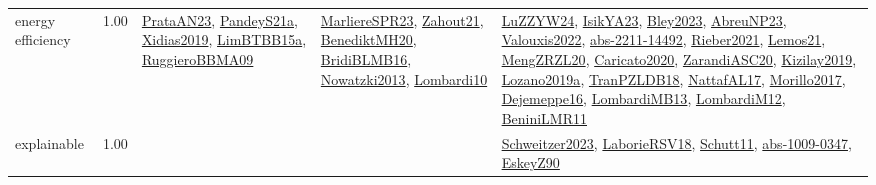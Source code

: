 {\begin{longtable}{p{3cm}r>{\raggedright\arraybackslash}p{6cm}>{\raggedright\arraybackslash}p{6cm}>{\raggedright\arraybackslash}p{8cm}}
\index{energy efficiency}\index{Concepts!energy efficiency}energy efficiency &  1.00 & \hyperref[detail:PrataAN23]{PrataAN23}, \hyperref[detail:PandeyS21a]{PandeyS21a}, \hyperref[detail:Xidias2019]{Xidias2019}, \hyperref[detail:LimBTBB15a]{LimBTBB15a}, \hyperref[detail:RuggieroBBMA09]{RuggieroBBMA09} & \hyperref[detail:MarliereSPR23]{MarliereSPR23}, \hyperref[detail:Zahout21]{Zahout21}, \hyperref[detail:BenediktMH20]{BenediktMH20}, \hyperref[detail:BridiBLMB16]{BridiBLMB16}, \hyperref[detail:Nowatzki2013]{Nowatzki2013}, \hyperref[detail:Lombardi10]{Lombardi10} & \hyperref[detail:LuZZYW24]{LuZZYW24}, \hyperref[detail:IsikYA23]{IsikYA23}, \hyperref[detail:Bley2023]{Bley2023}, \hyperref[detail:AbreuNP23]{AbreuNP23}, \hyperref[detail:Valouxis2022]{Valouxis2022}, \hyperref[detail:abs-2211-14492]{abs-2211-14492}, \hyperref[detail:Rieber2021]{Rieber2021}, \hyperref[detail:Lemos21]{Lemos21}, \hyperref[detail:MengZRZL20]{MengZRZL20}, \hyperref[detail:Caricato2020]{Caricato2020}, \hyperref[detail:ZarandiASC20]{ZarandiASC20}, \hyperref[detail:Kizilay2019]{Kizilay2019}, \hyperref[detail:Lozano2019a]{Lozano2019a}, \hyperref[detail:TranPZLDB18]{TranPZLDB18}, \hyperref[detail:NattafAL17]{NattafAL17}, \hyperref[detail:Morillo2017]{Morillo2017}, \hyperref[detail:Dejemeppe16]{Dejemeppe16}, \hyperref[detail:LombardiMB13]{LombardiMB13}, \hyperref[detail:LombardiM12]{LombardiM12}, \hyperref[detail:BeniniLMR11]{BeniniLMR11}\\
\index{explainable}\index{Concepts!explainable}explainable &  1.00 &  &  & \hyperref[detail:Schweitzer2023]{Schweitzer2023}, \hyperref[detail:LaborieRSV18]{LaborieRSV18}, \hyperref[detail:Schutt11]{Schutt11}, \hyperref[detail:abs-1009-0347]{abs-1009-0347}, \hyperref[detail:EskeyZ90]{EskeyZ90}\\

\end{longtable}}
